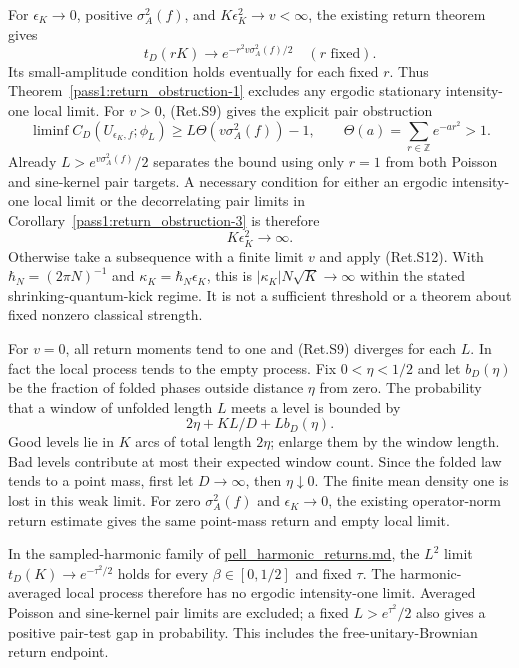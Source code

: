 For \(\epsilon_K\to0\), positive \(\sigma_A^2(f)\), and
\(K\epsilon_K^2\to v<\infty\), the existing return theorem gives
\[
             t_D(rK)\longrightarrow e^{-r^2v\sigma_A^2(f)/2}
                          \quad(r\text{ fixed}).                 \tag{Ret.S12}
\]
Its small-amplitude condition holds eventually for each fixed \(r\).
Thus Theorem~\ref{pass1:return_obstruction-1} excludes any ergodic stationary intensity-one local limit.
For \(v>0\), (Ret.S9) gives the explicit pair obstruction
\[
 \liminf C_D(U_{\epsilon_K,f};\phi_L)
   \ge L\Theta(v\sigma_A^2(f))-1,
 \qquad\Theta(a)=\sum_{r\in\mathbb Z}e^{-ar^2}>1.                \tag{Ret.S13}
\]
Already \(L>e^{v\sigma_A^2(f)}/2\) separates the bound using only \(r=1\)
from both Poisson and sine-kernel pair targets.
A necessary condition for either an ergodic intensity-one local limit or the
decorrelating pair limits in Corollary~\ref{pass1:return_obstruction-3} is therefore
\[
                          K\epsilon_K^2\longrightarrow\infty.   \tag{Ret.S14}
\]
Otherwise take a subsequence with a finite limit \(v\) and apply (Ret.S12).
With \(\hbar_N=(2\pi N)^{-1}\) and \(\kappa_K=\hbar_N\epsilon_K\), this is
\(|\kappa_K|N\sqrt K\to\infty\) within the stated shrinking-quantum-kick
regime. It is not a sufficient threshold or a theorem about fixed nonzero
classical strength.

For \(v=0\), all return moments tend to one and (Ret.S9) diverges for each \(L\).
In fact the local process tends to the empty process. Fix \(0<\eta<1/2\)
and let \(b_D(\eta)\) be the fraction of folded phases outside distance \(\eta\)
from zero. The probability that a window of unfolded length \(L\) meets a
level is bounded by
\[
                          2\eta+KL/D+L b_D(\eta).                \tag{Ret.S15}
\]
Good levels lie in \(K\) arcs of total length \(2\eta\); enlarge them by the
window length. Bad levels contribute at most their expected window count.
Since the folded law tends to a point mass, first let \(D\to\infty\), then
\(\eta\downarrow0\). The finite mean density one is lost in this weak limit.
For zero \(\sigma_A^2(f)\) and \(\epsilon_K\to0\), the existing operator-norm
return estimate gives the same point-mass return and empty local limit.

In the sampled-harmonic family of
\href{https://github.com/ChurilovMaksim/BGS/blob/main/mathematics/pell/pell_harmonic_returns.md}{pell\_harmonic\_returns.md}, the \(L^2\) limit
\(t_D(K)\to e^{-\tau^2/2}\) holds for every \(\beta\in[0,1/2]\) and fixed \(\tau\).
The harmonic-averaged local process therefore has no ergodic intensity-one
limit. Averaged Poisson and sine-kernel pair limits are excluded; a fixed
\(L>e^{\tau^2}/2\) also gives a positive pair-test gap in probability. This
includes the free-unitary-Brownian return endpoint.

